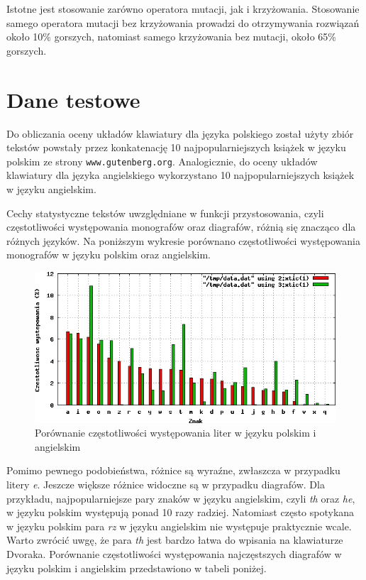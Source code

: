 \documentclass[brudnopis]{xmgr}
\begin{document}
Istotne jest stosowanie zarówno operatora mutacji, jak i krzyżowania. Stosowanie samego operatora mutacji bez krzyżowania prowadzi do otrzymywania rozwiązań około 10\% gorszych, natomiast samego krzyżowania bez mutacji, około 65\% gorszych.



\section{Dane testowe}

Do obliczania oceny układów klawiatury dla języka polskiego został użyty zbiór tekstów powstały przez konkatenację 10 najpopularniejszych książek w języku polskim ze strony {\tt www.gutenberg.org}. Analogicznie, do oceny układów klawiatury dla języka angielskiego wykorzystano 10 najpopularniejszych książek w języku angielskim.

Cechy statystyczne tekstów uwzględniane w funkcji przystosowania, czyli częstotliwości występowania monografów oraz diagrafów, różnią się znacząco dla różnych języków. Na poniższym wykresie porównano częstotliwości występowania monografów w języku polskim oraz angielskim.

\begin{figure}[!tbh]
\centering
\includegraphics[width=.8\hsize]{fig/frequencies}
\caption{Porównanie częstotliwości występowania liter w języku polskim i angielskim}
\end{figure}

Pomimo pewnego podobieństwa, różnice są wyraźne, zwłaszcza w przypadku litery \emph{e}. Jeszcze większe różnice widoczne są w przypadku diagrafów. Dla przykładu, najpopularniejsze pary znaków w języku angielskim, czyli \emph{th} oraz \emph{he}, w języku polskim występują ponad 10 razy radziej. Natomiast często spotykana w języku polskim para \emph{rz} w języku angielskim nie występuje praktycznie wcale. Warto zwrócić uwgę, że para \emph{th} jest bardzo łatwa do wpisania na klawiaturze Dvoraka. Porównanie częstotliwości występowania najczęstszych diagrafów w języku polskim i angielskim przedstawiono w tabeli poniżej.
\end{document}
